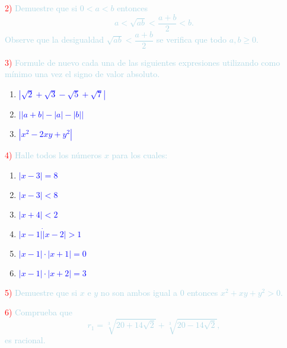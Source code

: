 \textcolor{red}{2) }\textcolor{lightblue}{Demuestre que si $0<a<b$ entonces \[ a<\sqrt{ab}<\dfrac{a+b}{2}<b. \] Observe que la desigualdad $\sqrt{ab}<\dfrac{a+b}{2}$ se verifica que todo $a,b\ge0$.}

\textcolor{red}{3) }\textcolor{lightblue}{Formule de nuevo cada una de las siguientes expresiones utilizando como mínimo una vez el signo de valor absoluto.}

\begin{enumerate}[label=\color{red}\alph*)]
	\item \textcolor{blue}{$|\sqrt{2}+\sqrt{3}-\sqrt{5}+\sqrt{7}|$}
	
	
	
	\item \textcolor{blue}{$\left||a+b|-|a|-|b|\right|$}
	
	
	
	\item \textcolor{blue}{$|x^2-2xy+y^2|$}
	
	
\end{enumerate}

\textcolor{red}{4) }\textcolor{lightblue}{Halle todos los números $x$ para los cuales:}

\begin{enumerate}[label=\color{red}\alph*)]
	\item \textcolor{blue}{$|x-3|=8$}
	
	

	\item \textcolor{blue}{$|x-3|<8$}
	
	
	
	\item \textcolor{blue}{$|x+4|<2$}
	
	
	
	\item \textcolor{blue}{$|x-1|\dot|x-2|>1$}
	
	
	
	\item \textcolor{blue}{$|x-1|\cdot|x+1|=0$}
	
	
	
	\item \textcolor{blue}{$|x-1|\cdot|x+2|=3$}
	
	
\end{enumerate}
\textcolor{red}{5) }\textcolor{lightblue}{Demuestre que si $x$ e $y$ no son ambos igual a 0 entonces $x^2+xy+y^2>0$.}

\textcolor{red}{6) }\textcolor{lightblue}{Comprueba que \[ r_1=\sqrt[3]{20+14\sqrt{2}}+\sqrt[3]{20-14\sqrt{2}}, \] es racional.}

